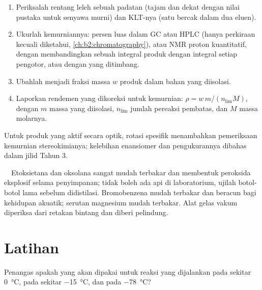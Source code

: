 \begin{method}\label{met:b2:lab-techniques-2:purity}
\begin{enumerate}
  \item Periksalah rentang leleh sebuah padatan (tajam dan dekat dengan
        nilai pustaka untuk senyawa murni) dan KLT-nya (satu bercak dalam
        dua eluen).
  \item Ukurlah kemurniannya: persen luas dalam GC atau HPLC (hanya
        perkiraan kecuali  diketahui,
        \cref{ch:b2:chromatography}), atau NMR proton kuantitatif, dengan
        membandingkan sebuah integral produk dengan integral setiap
        pengotor, atau dengan  yang ditimbang.
  \item Ubahlah menjadi fraksi massa $w$ produk dalam bahan yang diisolasi.
  \item Laporkan rendemen yang dikoreksi untuk kemurnian: $\rho = w\,m/(n_{\mathrm{lim}}M)$,
        dengan $m$ massa yang diisolasi, $n_{\mathrm{lim}}$ jumlah pereaksi
        pembatas, dan $M$ massa molarnya.
\end{enumerate}
\end{method}

Untuk produk yang aktif secara optik, rotasi spesifik menambahkan
pemeriksaan kemurnian stereokimianya; kelebihan enansiomer dan
pengukurannya dibahas dalam jilid Tahun 3.

\begin{safety}{\,\,\,\,}
Etoksietana dan oksolana sangat mudah terbakar dan membentuk peroksida
eksplosif selama penyimpanan; tidak boleh ada api di laboratorium, ujilah
botol-botol lama sebelum didistilasi. Bromobenzena mudah terbakar dan
beracun bagi kehidupan akuatik; serutan magnesium mudah terbakar. Alat gelas
vakum diperiksa dari retakan bintang dan diberi pelindung.
\end{safety}

\section{Latihan}

\begin{exercise}[$\star$]\label{exo:b2:lab-techniques-2:1}
Penangas apakah yang akan dipakai untuk reaksi yang dijalankan pada sekitar
\qty{0}{\degreeCelsius}, pada sekitar
\qty{-15}{\degreeCelsius}, dan pada \qty{-78}{\degreeCelsius}?
\end{exercise}

